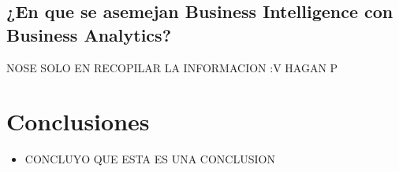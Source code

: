 \documentclass[twoside,twocolumn]{article}
\begin{document}
\subsection{¿En que se asemejan Business Intelligence con Business Analytics?}

NOSE SOLO EN RECOPILAR LA INFORMACION :V HAGAN P






\section{Conclusiones}
\begin{itemize}	
	\item CONCLUYO QUE ESTA ES UNA CONCLUSION

\end{itemize} 



\end{document}
